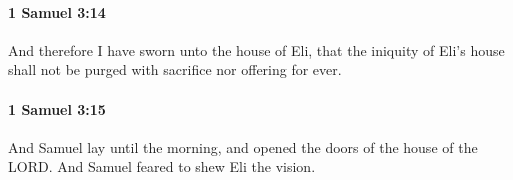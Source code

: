 		\paragraph{1 Samuel 3:14} %
			\label{1SAMUEL-3-14}

			And therefore I have sworn unto the house of Eli, that the iniquity of Eli’s house shall not be purged with sacrifice nor offering for ever.


		\paragraph{1 Samuel 3:15} %
			\label{1SAMUEL-3-15}

			And Samuel lay until the morning, and opened the doors of the house of the LORD. And Samuel feared to shew Eli the vision.


